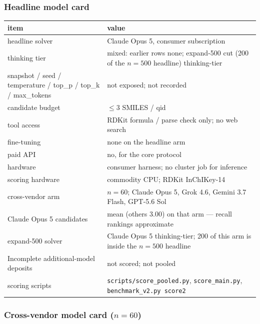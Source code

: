 \subsubsection{Headline model card}

\begin{center}
\begin{minipage}{\linewidth}
\centering
{}
\small
\setlength{\tabcolsep}{3pt}
\begin{tabular}{@{}>{\raggedright\arraybackslash}p{4.3cm}>{\raggedright\arraybackslash}p{8.5cm}@{}}
\toprule
item & value \\
\midrule
headline solver & Claude Opus 5, consumer subscription \\
thinking tier & mixed: earlier rows none; expand-500 cut (200 of the $n{=}500$ headline) thinking-tier \\
snapshot / seed / temperature / top\_p / top\_k / max\_tokens &
  not exposed; not recorded \\
candidate budget & $\leq 3$ SMILES / qid \\
tool access & RDKit formula / parse check only; no web search \\
fine-tuning & none on the headline arm \\
paid API & no, for the core protocol \\
hardware & consumer harness; no cluster job for inference \\
scoring hardware & commodity CPU; RDKit InChIKey-14 \\
cross-vendor arm & $n{=}60$; Claude Opus 5, Grok 4.6, Gemini 3.7 Flash, GPT-5.6 Sol \\
Claude Opus 5 candidates & 2.20 mean (others 3.00) on that arm --- recall rankings approximate \\
expand-500 solver & Claude Opus 5 thinking-tier; 200 of this arm is inside the $n{=}500$ headline \\
Incomplete additional-model deposits & not scored; not pooled \\
scoring scripts & \texttt{scripts/score\_pooled.py}, \texttt{score\_main.py},
  \texttt{benchmark\_v2.py score2} \\
\bottomrule
\end{tabular}
\end{minipage}
\end{center}
\FloatBarrier

\subsubsection{Cross-vendor model card \texorpdfstring{($n{=}60$)}{(n=60)}}

